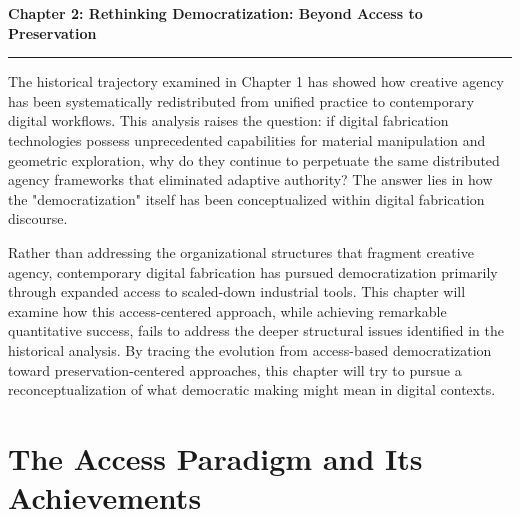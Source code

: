\clearpage
\setcounter{chapter}{2}
\setcounter{section}{0}


\pagestyle{fancy}
\fancyhf{} %
\fancyfoot[C]{\thepage} %
\renewcommand{\headrulewidth}{0pt}
\renewcommand{\footrulewidth}{0pt}

\noindent
{\Large\textbf{Chapter 2: Rethinking Democratization: Beyond Access to Preservation}}
\vspace{0.3cm}
\hrule
\vspace{0.8cm}
\label{ch:democratization}

\setlength{\parindent}{0pt}

The historical trajectory examined in Chapter 1 has showed how creative agency has been systematically redistributed from unified practice to contemporary digital workflows. This analysis raises the question: if digital fabrication technologies possess unprecedented capabilities for material manipulation and geometric exploration, why do they continue to perpetuate the same distributed agency frameworks that eliminated adaptive authority? The answer lies in how the "democratization" itself has been conceptualized within digital fabrication discourse.

\vspace{0.5cm}

Rather than addressing the organizational structures that fragment creative agency, contemporary digital fabrication has pursued democratization primarily through expanded access to scaled-down industrial tools. This chapter will examine how this access-centered approach, while achieving remarkable quantitative success, fails to address the deeper structural issues identified in the historical analysis. By tracing the evolution from access-based democratization toward preservation-centered approaches, this chapter will try to pursue a reconceptualization of what democratic making might mean in digital contexts.

\section{The Access Paradigm and Its Achievements}

